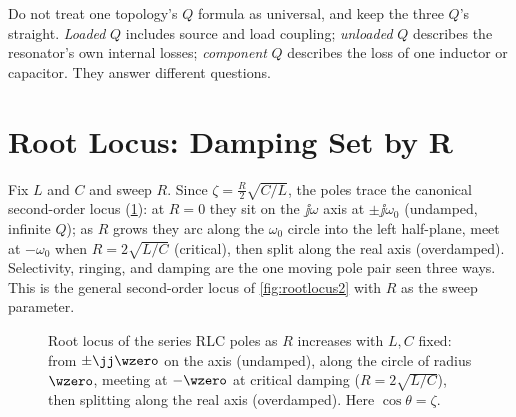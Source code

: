 \begin{mistakebox}
Do not treat one topology's \(Q\) formula as universal, and keep the three
\(Q\)'s straight. \emph{Loaded} \(Q\) includes source and load coupling;
\emph{unloaded} \(Q\) describes the resonator's own internal losses;
\emph{component} \(Q\) describes the loss of one inductor or capacitor. They
answer different questions.
\end{mistakebox}

\section{Root Locus: Damping Set by R}
Fix \(L\) and \(C\) and sweep \(R\). Since \(\zeta=\tfrac{R}{2}\sqrt{C/L}\), the
poles trace the canonical second-order locus (\cref{fig:rlc-rootlocus}): at
\(R=0\) they sit on the \(\jj\omega\) axis at \(\pm\jj\omega_0\) (undamped,
infinite \(Q\)); as \(R\) grows they arc along the \(\omega_0\) circle into the
left half-plane, meet at \(-\omega_0\) when \(R=2\sqrt{L/C}\) (critical), then
split along the real axis (overdamped). Selectivity, ringing, and damping are the
one moving pole pair seen three ways. This is the general second-order locus of
\cref{fig:rootlocus2} with \(R\) as the sweep parameter.

\begin{figure}[htbp]
\centering
{}
\caption{Root locus of the series RLC poles as \(R\) increases with \(L,C\)
fixed: from \(\pm\jj\wzero\) on the axis (undamped), along the circle of radius
\(\wzero\), meeting at \(-\wzero\) at critical damping (\(R=2\sqrt{L/C}\)), then
splitting along the real axis (overdamped). Here \(\cos\theta=\zeta\).}
\label{fig:rlc-rootlocus}
\end{figure}

